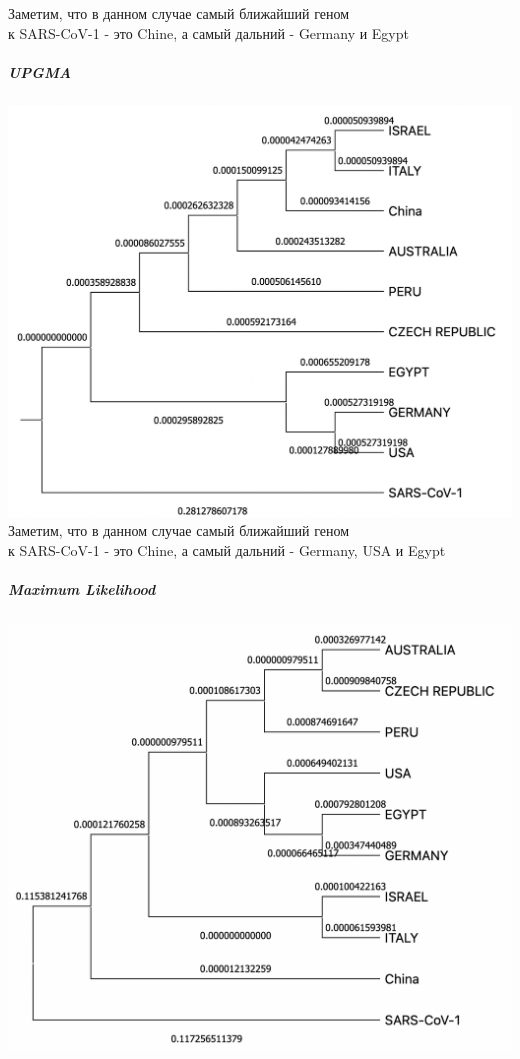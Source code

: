 \documentclass[12pt]{article}
\begin{document}
Заметим, что в данном случае самый ближайший геном\\к SARS-CoV-1 - это Chine, а самый дальний - Germany и Egypt

\subparagraph{UPGMA\\}
\includegraphics[scale=0.85]{images/UPGMA.png}\\

Заметим, что в данном случае самый ближайший геном\\к SARS-CoV-1 - это Chine, а самый дальний - Germany, USA и Egypt

\subparagraph{Maximum Likelihood\\}
\includegraphics[scale=0.85]{images/ML.png}\\
\end{document}
